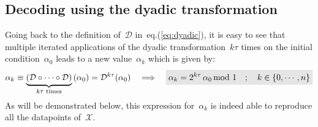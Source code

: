 \documentclass{article}
\newcommand{\highlight}[2][yellow]{\mathchoice%
  {\colorbox{#1}{$\displaystyle#2$}}%
  {\colorbox{#1}{$\textstyle#2$}}%
  {\colorbox{#1}{$\scriptstyle#2$}}%
  {\colorbox{#1}{$\scriptscriptstyle#2$}}}%
\begin{document}
\subsection{Decoding using the dyadic transformation} 

\noindent Going back to the definition of~$\mathcal{D}$ in~eq.(\ref{eq:dyadic}), it is easy to see that multiple iterated applications of the dyadic transformation~$k\tau$ times on the initial condition~$\alpha_0$ leads to a new value~$\alpha_k$ which is given by:
\begin{equation}
\alpha_k \equiv \underbrace{\left( \mathcal{D} \circ \cdots \circ \mathcal{D} \right)}_{k\tau \text{ times}} \, (\alpha_0) = \mathcal{D}^{k\tau} (\alpha_0) \quad \Longrightarrow \quad \highlight[black!10]{ \alpha_k = 2^{k\tau} \, \alpha_0 \, \text{mod} \,\, 1 \quad ; \quad k \in \{ 0, \cdots , n \} }
\label{eq:exactSol}
\end{equation}
As will be demonstrated below, this expression for~$\alpha_k$ is indeed able to reproduce all the datapoints of~$\mathcal{X}$.  \\
\end{document}
